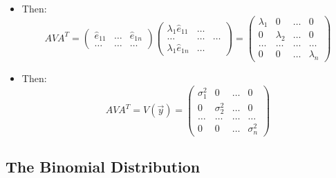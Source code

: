 \begin{itemize}
      \item Then:
            \[ A V A^T = \begin{pmatrix}
                        \hat{e}_{11} & \ldots & \hat{e}_{1n} \\
                        \ldots       & \ldots & \ldots
                  \end{pmatrix}
                  \begin{pmatrix}
                        \lambda_1 \hat{e}_{11} & \ldots          \\
                        \ldots                 & \ldots & \ldots \\
                        \lambda_1 \hat{e}_{1n} & \ldots
                  \end{pmatrix}
                  = \begin{pmatrix}
                        \lambda_1 & 0         & \ldots & 0         \\
                        0         & \lambda_2 & \ldots & 0         \\
                        \ldots    & \ldots    & \ldots & \ldots    \\
                        0         & 0         & \ldots & \lambda_n
                  \end{pmatrix} \]

      \item Then:
            \[ AVA^T = V(\vec{y}) = \begin{pmatrix}
                        \sigma_1^2 & 0          & \ldots & 0          \\
                        0          & \sigma_2^2 & \ldots & 0          \\
                        \ldots     & \ldots     & \ldots & \ldots     \\
                        0          & 0          & \ldots & \sigma_n^2
                  \end{pmatrix} \]
\end{itemize}

\subsection{The Binomial Distribution}

